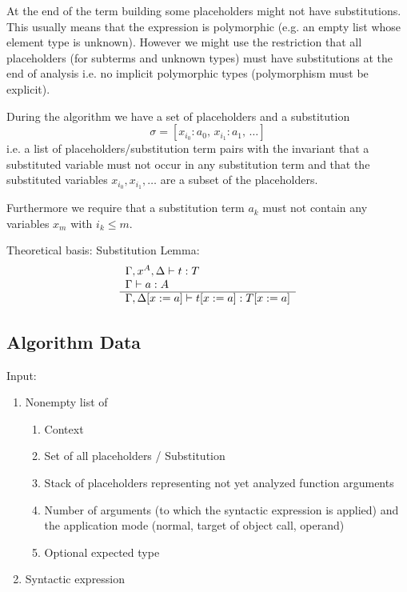 At the end of the term building some placeholders might not have
substitutions. This usually means that the expression is polymorphic (e.g. an
empty list whose element type is unknown). However we might use the
restriction that all placeholders (for subterms and unknown types) must have
substitutions at the end of analysis i.e. no implicit polymorphic types
(polymorphism must be explicit).

During the algorithm we have a set of placeholders and a substitution
$$
\sigma = [x_{i_0}: a_0,\, x_{i_1}: a_1,\, \ldots]
$$
i.e. a list of placeholders/substitution term pairs with the invariant that a
substituted variable must not occur in any substitution term and that the
substituted variables $x_{i_0}, x_{i_1}, \ldots$ are a subset of the
placeholders.

Furthermore we require that a substitution term $a_k$ must not contain any
variables $x_m$ with $i_k \le m$.

Theoretical basis: Substitution Lemma:
$$
\begin{array}{l} 
  \Gamma,x^A,\Delta \vdash t : T
  \\
  \Gamma \vdash a: A
 \\ \hline \Gamma, \Delta[x:=a] \vdash t[x:=a] : T[x:=a]\end{array}
$$


\subsection{Algorithm Data}


\noindent Input:

\begin{enumerate}

\item Nonempty list of

  \begin{enumerate}

  \item Context

  \item Set of all placeholders / Substitution

  \item Stack of placeholders representing not yet analyzed function arguments

  \item Number of arguments (to which the syntactic expression is applied) and
    the application mode (normal, target of object call, operand)

  \item Optional expected type
  \end{enumerate}

\item Syntactic expression
\end{enumerate}

